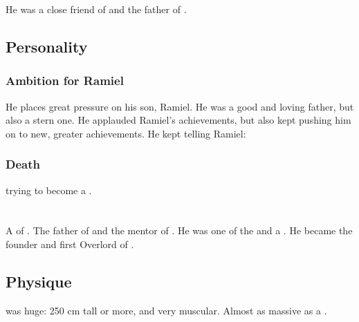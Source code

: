He was a close friend of  and the father of . 









\subsection{Personality}





\subsubsection{Ambition for Ramiel}
He places great pressure on his son, Ramiel. 
He was a good and loving father, but also a stern one. 
He applauded Ramiel's achievements, but also kept pushing him on to new, greater achievements. 
He kept telling Ramiel: 





\subsubsection{Death}
 trying to become a \sathariah.















\section{\Netzach}
\index{\Zachirah}
A \resphan{} of .
The father of  and the mentor of . 
He was one of the  and a . 
He became the founder and first Overlord of . 








\subsection{Physique}
\Zachirah{} was huge: 
250 cm tall or more, and very muscular. 
Almost as massive as a \nephil. 

